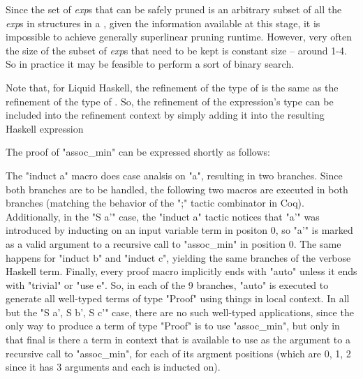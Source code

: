 Since the set of \textit{exp}s that can be safely pruned is an arbitrary subset of all the \textit{exp}s in  structures in a \LangBTerm, given the information available at this stage, it is impossible to achieve generally superlinear pruning runtime. 
However, very often the size of the subset of \textit{exp}s that need to be kept is constant size -- around 1-4.
So in practice it may be feasible to perform a sort of binary search.

% 
% 

Note that, for Liquid Haskell, the refinement of the type of  is the same as the refinement of the type of .
So, the refinement of the expression's type can be included into the refinement context by simply adding it into the resulting Haskell expression

The proof of "assoc\_min" can be expressed shortly as follows:
  
 The "induct a" macro does case analsis on "a", resulting in two branches. Since both branches are to be handled, the following two macros are executed in both branches (matching the behavior of the ";" tactic combinator in Coq).
 Additionally, in the "S a'" case, the "induct a" tactic notices that "a'" was introduced by inducting on an input variable term in positon 0, so "a'" is marked as a valid argument to a recursive call to "assoc\_min" in position 0.
 The same happens for "induct b" and "induct c", yielding the same branches of the verbose Haskell term.
 Finally, every proof macro implicitly ends with "auto" unless it ends with "trivial" or "use e".
 So, in each of the 9 branches, "auto" is executed to generate all well-typed terms of type "Proof" using things in local context.
 In all but the "S a', S b', S c'" case, there are no such well-typed applications, since the only way to produce a term of type "Proof" is to use "assoc\_min", but only in that final is there a term in context that is available to use as the argument to a recursive call to "assoc\_min", for each of its argment positions (which are 0, 1, 2 since it has 3 arguments and each is inducted on).
  